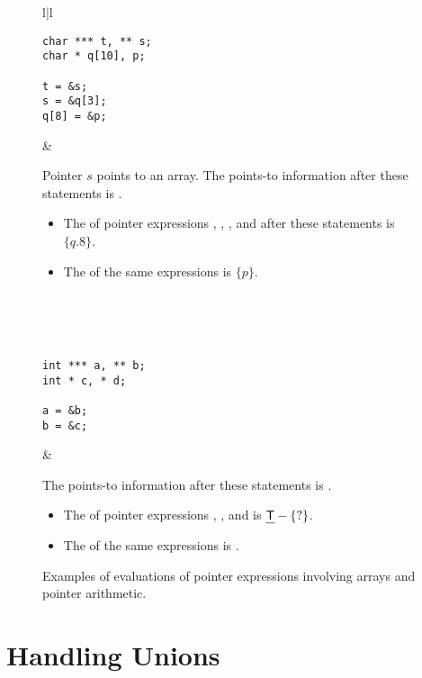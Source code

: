 \documentclass[a4paper,11pt,fleqn]{article}
\begin{document}
\begin{figure}[t]
\begin{center}
\begin{tabular}{l|l}
\begin{minipage}{40mm}
\begin{verbatim}
char *** t, ** s; 
char * q[10], p;

t = &s;
s = &q[3];
q[8] = &p;

\end{verbatim}
\end{minipage}
&
\begin{minipage}{110mm}
\raggedright
Pointer $s$ points to an array. The points-to information after these statements is
. 
\begin{itemize}
\item The
\lval of pointer expressions 
,
,
, and
 after these statements is
$\{q.8\}$. 
\item The \rval of the same expressions is $\{ p\}$.
\end{itemize}
\end{minipage}
\\
\\ \hline
\\
\begin{minipage}{40mm}
\begin{verbatim}
int *** a, ** b;
int * c, * d;

a = &b;
b = &c;
\end{verbatim}
\end{minipage}
&
\begin{minipage}{103mm}
\raggedright
The points-to information after these statements is
.
\begin{itemize}
\item The \lval of pointer expressions 
	,
	, and
	 is 
	$\text{\sf\em T\/} - \{?\}$. 
\item The \rval of the same expressions is  \target.
\end{itemize}
\end{minipage}
\end{tabular}
\end{center}
\caption{Examples of evaluations of pointer expressions involving arrays and pointer arithmetic.}
\label{fig:exmp.pointer.arith}
\end{figure}

\section{Handling Unions}
\label{sec:unions}
\end{document}
